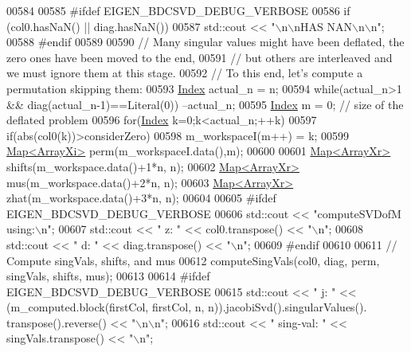 \begin{DoxyCode}
00584 
00585 \textcolor{preprocessor}{#ifdef EIGEN\_BDCSVD\_DEBUG\_VERBOSE}
00586   \textcolor{keywordflow}{if} (col0.hasNaN() || diag.hasNaN())
00587     std::cout << \textcolor{stringliteral}{"\(\backslash\)n\(\backslash\)nHAS NAN\(\backslash\)n\(\backslash\)n"};
00588 \textcolor{preprocessor}{#endif}
00589   
00590   \textcolor{comment}{// Many singular values might have been deflated, the zero ones have been moved to the end,}
00591   \textcolor{comment}{// but others are interleaved and we must ignore them at this stage.}
00592   \textcolor{comment}{// To this end, let's compute a permutation skipping them:}
00593   \hyperlink{namespace_eigen_a62e77e0933482dafde8fe197d9a2cfde}{Index} actual\_n = n;
00594   \textcolor{keywordflow}{while}(actual\_n>1 && diag(actual\_n-1)==Literal(0)) --actual\_n;
00595   \hyperlink{namespace_eigen_a62e77e0933482dafde8fe197d9a2cfde}{Index} m = 0; \textcolor{comment}{// size of the deflated problem}
00596   \textcolor{keywordflow}{for}(\hyperlink{namespace_eigen_a62e77e0933482dafde8fe197d9a2cfde}{Index} k=0;k<actual\_n;++k)
00597     \textcolor{keywordflow}{if}(abs(col0(k))>considerZero)
00598       m\_workspaceI(m++) = k;
00599   \hyperlink{group___core___module_class_eigen_1_1_map}{Map<ArrayXi>} perm(m\_workspaceI.data(),m);
00600   
00601   \hyperlink{group___core___module_class_eigen_1_1_map}{Map<ArrayXr>} shifts(m\_workspace.data()+1*n, n);
00602   \hyperlink{group___core___module_class_eigen_1_1_map}{Map<ArrayXr>} mus(m\_workspace.data()+2*n, n);
00603   \hyperlink{group___core___module_class_eigen_1_1_map}{Map<ArrayXr>} zhat(m\_workspace.data()+3*n, n);
00604 
00605 \textcolor{preprocessor}{#ifdef EIGEN\_BDCSVD\_DEBUG\_VERBOSE}
00606   std::cout << \textcolor{stringliteral}{"computeSVDofM using:\(\backslash\)n"};
00607   std::cout << \textcolor{stringliteral}{"  z: "} << col0.transpose() << \textcolor{stringliteral}{"\(\backslash\)n"};
00608   std::cout << \textcolor{stringliteral}{"  d: "} << diag.transpose() << \textcolor{stringliteral}{"\(\backslash\)n"};
00609 \textcolor{preprocessor}{#endif}
00610   
00611   \textcolor{comment}{// Compute singVals, shifts, and mus}
00612   computeSingVals(col0, diag, perm, singVals, shifts, mus);
00613   
00614 \textcolor{preprocessor}{#ifdef EIGEN\_BDCSVD\_DEBUG\_VERBOSE}
00615   std::cout << \textcolor{stringliteral}{"  j:        "} << (m\_computed.block(firstCol, firstCol, n, n)).jacobiSvd().singularValues().
      transpose().reverse() << \textcolor{stringliteral}{"\(\backslash\)n\(\backslash\)n"};
00616   std::cout << \textcolor{stringliteral}{"  sing-val: "} << singVals.transpose() << \textcolor{stringliteral}{"\(\backslash\)n"};

\end{DoxyCode}
